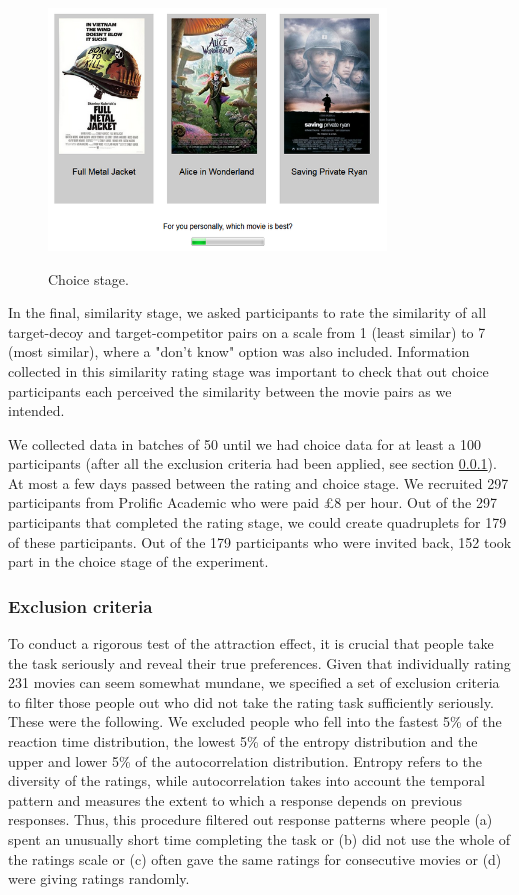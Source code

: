 \documentclass[12pt, a4paper]{article}
\begin{document}
\begin{figure}[htb!]
\centering
\captionsetup{justification=centering}
\caption{Choice stage.}
\includegraphics[width=0.8\textwidth]{rsz_exp1_choicestage.png}
\label{fig:exp1_screenshot}
\end{figure}

In the final, similarity stage, we asked participants to rate the similarity of all target-decoy and target-competitor pairs on a scale from 1 (least similar) to 7 (most similar), where a "don't know" option was also included. Information collected in this similarity rating stage was important to check that out choice participants each perceived the similarity between the movie pairs as we intended.

We collected data in batches of 50 until we had choice data for at least a 100 participants (after all the exclusion criteria had been applied, see section \ref{exclusion_ref}). At most a few days passed between the rating and choice stage. We recruited 297 participants from Prolific Academic who were paid £8 per hour. Out of the 297 participants that completed the rating stage, we could create quadruplets for 179 of these participants. Out of the 179 participants who were invited back, 152 took part in the choice stage of the experiment.

\subsubsection{Exclusion criteria} \label{exclusion_ref}

To conduct a rigorous test of the attraction effect, it is crucial that people take the task seriously and reveal their true preferences. Given that individually rating 231 movies can seem somewhat mundane, we specified a set of exclusion criteria to filter those people out who did not take the rating task sufficiently seriously. These were the following. We excluded people who fell into the fastest 5\% of the reaction time distribution, the lowest 5\% of the entropy distribution and the upper and lower 5\% of the autocorrelation distribution. Entropy refers to the diversity of the ratings, while autocorrelation takes into account the temporal pattern and measures the extent to which a response depends on previous responses. Thus, this procedure filtered out response patterns where people (a) spent an unusually short time completing the task or (b) did not use the whole of the ratings scale or (c) often gave the same ratings for consecutive movies or (d) were giving ratings randomly.
\end{document}
